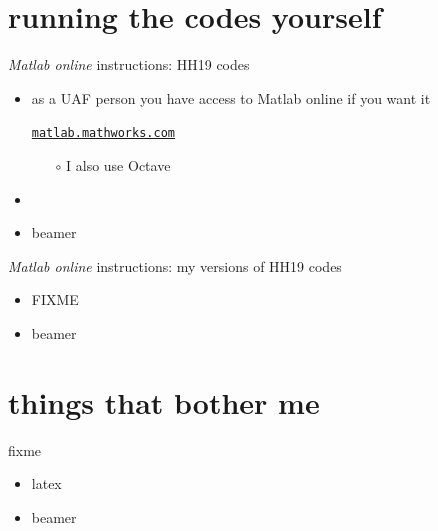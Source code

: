 \documentclass[xcolor={svgnames},
               hyperref={colorlinks,citecolor=DeepPink4,linkcolor=FireBrick,urlcolor=Maroon}]
               {beamer}
\begin{document}
\section{running the codes yourself}

\begin{frame}{\emph{Matlab online} instructions: HH19 codes}

\begin{itemize}
\item as a UAF person you have access to Matlab online if you want it

\begin{center}
\href{https://matlab.mathworks.com/}{\texttt{matlab.mathworks.com}}
\end{center}

    \begin{itemize}
    \item[$\circ$] I also use Octave
    \end{itemize}
\item 
\item beamer
\end{itemize}
\end{frame}


\begin{frame}{\emph{Matlab online} instructions: my versions of HH19 codes}

\begin{itemize}
\item FIXME
\item beamer
\end{itemize}
\end{frame}


\section{things that bother me}

\begin{frame}{fixme}

\begin{itemize}
\item latex
\item beamer
\end{itemize}
\end{frame}
\end{document}

